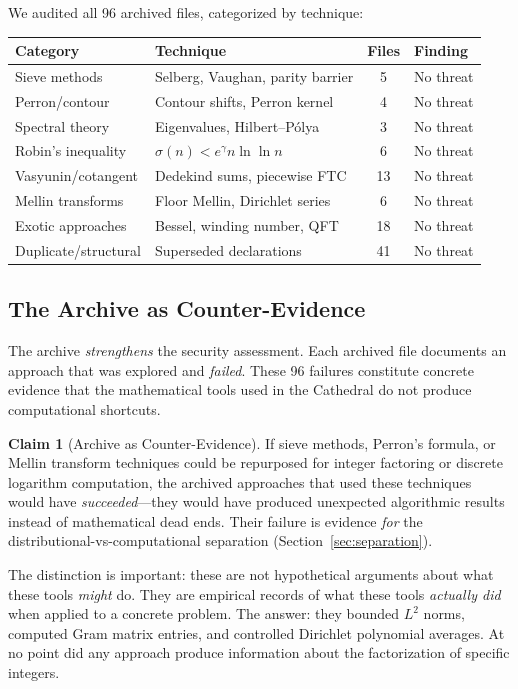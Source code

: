 \documentclass[11pt,a4paper]{article}
\theoremstyle{definition}
\newtheorem{claim}[theorem]{Claim}
\theoremstyle{plain}
\begin{document}
We audited all 96 archived files, categorized by technique:

\begin{center}
\small
\begin{tabular}{@{}llcl@{}}
\toprule
\textbf{Category} & \textbf{Technique} & \textbf{Files} & \textbf{Finding} \\
\midrule
Sieve methods & Selberg, Vaughan, parity barrier & 5 & No threat \\
Perron/contour & Contour shifts, Perron kernel & 4 & No threat \\
Spectral theory & Eigenvalues, Hilbert--P\'olya & 3 & No threat \\
Robin's inequality & $\sigma(n) < e^\gamma n\ln\ln n$ & 6 & No threat \\
Vasyunin/cotangent & Dedekind sums, piecewise FTC & 13 & No threat \\
Mellin transforms & Floor Mellin, Dirichlet series & 6 & No threat \\
Exotic approaches & Bessel, winding number, QFT & 18 & No threat \\
Duplicate/structural & Superseded declarations & 41 & No threat \\
\bottomrule
\end{tabular}
\end{center}

\subsection{The Archive as Counter-Evidence}

The archive \emph{strengthens} the security assessment. Each archived
file documents an approach that was explored and \emph{failed}. These
96 failures constitute concrete evidence that the mathematical tools
used in the Cathedral do not produce computational shortcuts.

\begin{claim}[Archive as Counter-Evidence]
If sieve methods, Perron's formula, or Mellin transform techniques
could be repurposed for integer factoring or discrete logarithm
computation, the archived approaches that used these techniques
would have \emph{succeeded}---they would have produced unexpected
algorithmic results instead of mathematical dead ends. Their failure
is evidence \emph{for} the distributional-vs-computational separation
(Section~\ref{sec:separation}).
\end{claim}

The distinction is important: these are not hypothetical arguments
about what these tools \emph{might} do. They are empirical records
of what these tools \emph{actually did} when applied to a
concrete problem. The answer: they bounded $L^2$ norms, computed
Gram matrix entries, and controlled Dirichlet polynomial averages.
At no point did any approach produce information about the
factorization of specific integers.
\end{document}
